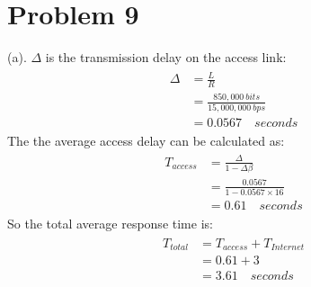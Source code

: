 \documentclass[titlepage, paper=a4, fontsize=11pt]{scrartcl} %
\numberwithin{equation}{section} %
\numberwithin{table}{section} %
\begin{document}

\section*{Problem 9}
(a). $\Delta$ is the transmission delay on the access link:
\begin{align*} 
\begin{split}
\Delta &= \frac{L}{R} \\
&= \frac{850,000 \  bits}{15,000,000 \  bps} \\
&= 0.0567 \quad seconds
\end{split}					
\end{align*}
The the average access delay can be calculated as:
\begin{align*} 
\begin{split}
T_{access} &= \frac{\Delta}{1-\Delta\beta} \\
&= \frac{0.0567}{1-0.0567 \times 16} \\
&= 0.61 \quad seconds
\end{split}					
\end{align*}
So the total average response time is:
\begin{align*} 
\begin{split}
T_{total} &= T_{access} + T_{Internet} \\
&= 0.61 + 3 \\
&= 3.61 \quad seconds
\end{split}					
\end{align*}
\end{document}

